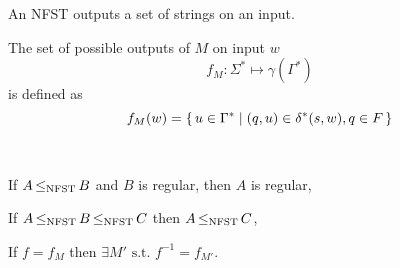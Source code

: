 An NFST outputs a set of strings on an input.

\begin{definition}
    The set of possible outputs of $M$ on input $w$
    \[
        f_M \colon \Sigma^* \mapsto \gamma (\Gamma^*)
    \]
    is defined as
    \[
        f_M(w) = { \left\{\, u \in \Gamma^* \mid (q,u) \in \delta^*(s,w), q \in F \,\right\} }
    \]
\end{definition}

\begin{theorem}\
    \begin{compactitem}
    \item If $A { \,\le_{\text{\upshape NFST}}\, } B$ and $B$ is regular, then $A$ is regular,
    \item If $A { \,\le_{\text{\upshape NFST}}\, } B { \,\le_{\text{\upshape NFST}}\, } C$ then $A { \,\le_{\text{\upshape NFST}}\, } C$,
    \item If $f = f_M$ then $\exists M' \text{ s.t.\ } f^{-1} = f_{M'}$.
    \end{compactitem}
\end{theorem}

